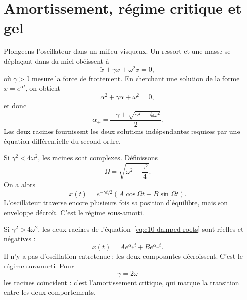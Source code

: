 \section{Amortissement, régime critique et gel}

Plongeons l’oscillateur dans un milieu visqueux. Un ressort et une masse se déplaçant dans du miel obéissent à
\begin{equation}
\ddot x+\gamma\dot x+\omega^2x=0,
\label{eq:c10-damped}
\end{equation}
où \(\gamma>0\) mesure la force de frottement. En cherchant une solution de la forme \(x=e^{\alpha t}\), on obtient
\begin{equation}
\alpha^2+\gamma\alpha+\omega^2=0,
\end{equation}
et donc
\begin{equation}
\alpha_\pm
=\frac{-\gamma\pm\sqrt{\gamma^2-4\omega^2}}{2}.
\label{eq:c10-damped-roots}
\end{equation}
Les deux racines fournissent les deux solutions indépendantes requises par une équation différentielle du second ordre.

\begin{classroomqa}
\end{classroomqa}

Si \(\gamma^2<4\omega^2\), les racines sont complexes. Définissons
\[
\Omega=\sqrt{\omega^2-\frac{\gamma^2}{4}}.
\]
On a alors
\begin{equation}
x(t)=e^{-\gamma t/2}
\left(A\cos\Omega t+B\sin\Omega t\right).
\label{eq:c10-underdamped}
\end{equation}
L’oscillateur traverse encore plusieurs fois sa position d’équilibre, mais son enveloppe décroît. C’est le régime sous-amorti.

Si \(\gamma^2>4\omega^2\), les deux racines de l’équation~\eqref{eq:c10-damped-roots} sont réelles et négatives :
\begin{equation}
x(t)=A e^{\alpha_+t}+B e^{\alpha_-t}.
\label{eq:c10-overdamped}
\end{equation}
Il n’y a pas d’oscillation entretenue ; les deux composantes décroissent. C’est le régime suramorti. Pour
\begin{equation}
\gamma=2\omega
\label{eq:c10-critical}
\end{equation}
les racines coïncident : c’est l’amortissement critique, qui marque la transition entre les deux comportements.

